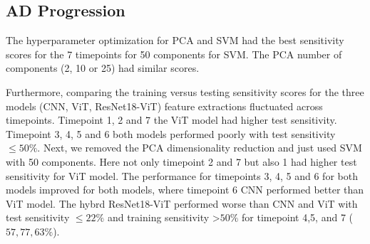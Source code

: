     



\subsection{AD Progression}
The hyperparameter optimization for PCA and SVM had the best sensitivity scores for the 7 timepoints for 50 components for SVM. The PCA number of components (2, 10 or 25) had similar scores. 

    

Furthermore, comparing the training versus testing sensitivity scores for the three models (CNN, ViT, ResNet18-ViT) feature extractions fluctuated across timepoints. Timepoint 1, 2 and 7 the ViT model had higher test sensitivity. Timepoint 3, 4, 5 and 6 both models performed poorly with test sensitivity $ \leq 50 \%$. Next, we removed the PCA dimensionality reduction and just used SVM with 50 components. Here not only timepoint 2 and 7 but also 1 had higher test sensitivity for ViT model. The performance for timepoints 3, 4, 5 and 6 for both models improved for both models, where timepoint 6 CNN performed better than ViT model.  The hybrd ResNet18-ViT performed worse than CNN and ViT with test sensitivity $\leq 22 \% $ and training sensitivity \textgreater $50 \% $ for timepoint 4,5, and 7 ($57, 77, 63 \%$).  


